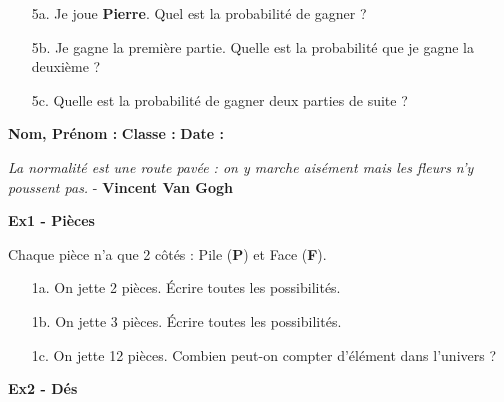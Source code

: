 \begin{enumerate}
  \item[5a.] Je joue \textbf{Pierre}. Quel est la probabilité de gagner ? \\ \Pointilles[2] 
  \item[5b.] Je gagne la première partie. Quelle est la probabilité que je gagne la deuxième ? \\ \Pointilles[4] 
  \item[5c.] Quelle est la probabilité de gagner deux parties de suite ? \\ \Pointilles[4] 
\end{enumerate}

\newpage


\textbf{Nom, Prénom :} \hspace{8cm} \textbf{Classe :} \hspace{3cm} \textbf{Date :}\\
\vspace{-0.8cm}
\begin{center}
  \textit{La normalité est une route pavée : on y marche aisément mais les fleurs n’y poussent pas.} - \textbf{Vincent Van Gogh}
\end{center}

\textbf{Ex1 - Pièces}

\begin{multicols}{2}\noindent 

Chaque pièce n'a que 2 côtés : Pile (\textbf{P}) et Face (\textbf{F}).

\begin{enumerate}
  \item[1a.] On jette 2 pièces. Écrire toutes les possibilités. \\ \Pointilles[2]  \columnbreak 
  \item[1b.] On jette 3 pièces. Écrire toutes les possibilités. \\ \Pointilles[4]
\end{enumerate}  \end{multicols} 
\begin{enumerate}
  \item[1c.] On jette 12 pièces. Combien peut-on compter d'élément dans l'univers ? \\ \Pointilles[4]
\end{enumerate}  

\textbf{Ex2 - Dés}

